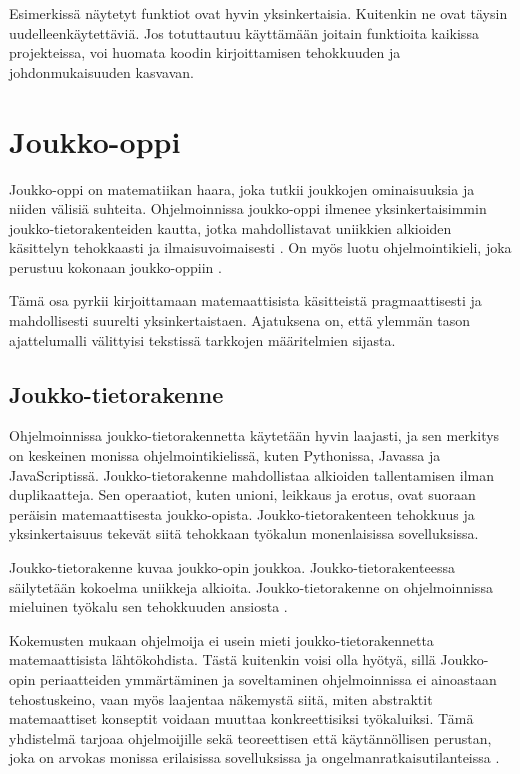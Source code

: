 Esimerkissä näytetyt funktiot ovat hyvin yksinkertaisia. Kuitenkin ne ovat täysin uudelleenkäytettäviä. Jos totuttautuu käyttämään joitain funktioita kaikissa projekteissa, voi huomata koodin kirjoittamisen tehokkuuden ja johdonmukaisuuden kasvavan.

\section{Joukko-oppi}
Joukko-oppi on matematiikan haara, joka tutkii joukkojen ominaisuuksia ja niiden välisiä suhteita. Ohjelmoinnissa joukko-oppi ilmenee yksinkertaisimmin joukko-tietorakenteiden kautta, jotka mahdollistavat uniikkien alkioiden käsittelyn tehokkaasti ja ilmaisuvoimaisesti \cite{mdn_set,mdn_set_methods}. On myös luotu ohjelmointikieli, joka perustuu kokonaan joukko-oppiin \cite{SETL_SET_LANGUAGE}.


Tämä osa pyrkii kirjoittamaan matemaattisista käsitteistä pragmaattisesti ja mahdollisesti suurelti yksinkertaistaen. Ajatuksena on, että ylemmän tason ajattelumalli välittyisi tekstissä tarkkojen määritelmien sijasta.


\subsection{Joukko-tietorakenne}

Ohjelmoinnissa joukko-tietorakennetta käytetään hyvin laajasti, ja sen merkitys on keskeinen monissa ohjelmointikielissä, kuten Pythonissa, Javassa ja JavaScriptissä. Joukko-tietorakenne mahdollistaa alkioiden tallentamisen ilman duplikaatteja. Sen operaatiot, kuten unioni, leikkaus ja erotus, ovat suoraan peräisin matemaattisesta joukko-opista. Joukko-tietorakenteen tehokkuus ja yksinkertaisuus tekevät siitä tehokkaan työkalun monenlaisissa sovelluksissa. \citep{mdn_set,ecma_spec}

Joukko-tietorakenne kuvaa joukko-opin joukkoa. Joukko-tietorakenteessa säilytetään kokoelma uniikkeja alkioita. Joukko-tietorakenne on ohjelmoinnissa mieluinen työkalu sen tehokkuuden ansiosta \cite{ecma_spec}.

Kokemusten mukaan ohjelmoija ei usein mieti joukko-tietorakennetta matemaattisista lähtökohdista. Tästä kuitenkin voisi olla hyötyä, sillä Joukko-opin periaatteiden ymmärtäminen ja soveltaminen ohjelmoinnissa ei ainoastaan tehostuskeino, vaan myös laajentaa näkemystä siitä, miten abstraktit matemaattiset konseptit voidaan muuttaa konkreettisiksi työkaluiksi. Tämä yhdistelmä tarjoaa ohjelmoijille sekä teoreettisen että käytännöllisen perustan, joka on arvokas monissa erilaisissa sovelluksissa ja ongelmanratkaisutilanteissa \cite{bartosz_category_for_progamers}.

